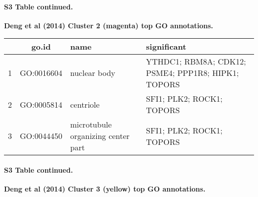 \documentclass[10pt,letterpaper]{article}
\begin{document}
\paragraph*{S3 Table continued.}
{\bf Deng et al (2014) Cluster 2 (magenta) top GO annotations.}

\begin{table}[!hp]
\begin{adjustwidth}{-.5in}{0in}
\begin{tabular}{|c|c|p{1.5in}|p{4in}|}
  \hline
 & go.id & name  & significant \\
  \hline
1 & GO:0016604 & nuclear body  & \footnotesize{YTHDC1; RBM8A; CDK12; PSME4; PPP1R8; HIPK1; TOPORS} \\
  2 & GO:0005814 & centriole  & \footnotesize{SFI1; PLK2; ROCK1; TOPORS} \\
  3 & GO:0044450 & microtubule organizing center part  & \footnotesize{SFI1; PLK2; ROCK1; TOPORS} \\
   \hline
\end{tabular}
 \end{adjustwidth}
  \end{table}


\clearpage
\paragraph*{S3 Table continued.}
{\bf Deng et al (2014) Cluster 3 (yellow) top GO annotations.}
\end{document}
